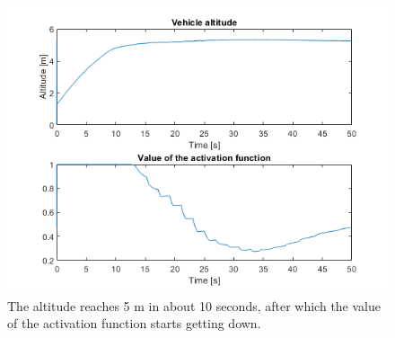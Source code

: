 \documentclass{article}
\begin{document}
\begin{figure}[H]
	\centering
	\hspace{10mm}
	\label{fig:ex1.2.3_case5m_ab}
\end{figure}
\begin{figure}[H]
	\centering
	\includegraphics[scale=0.55]{images/Ex1/SafeNavigation_5m_AltAndActFunct}
	\caption{The altitude reaches 5 m in about 10 seconds, after which the value of the activation function starts getting down.}
	\label{fig:ex1.2.3_case5m_c}
\end{figure}
\end{document}

